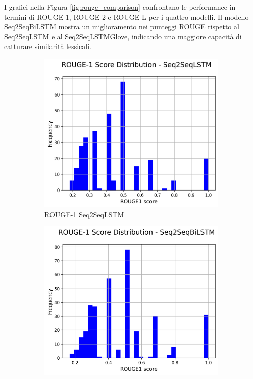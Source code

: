 I grafici nella Figura \ref{fig:rouge_comparison} confrontano le performance in termini di ROUGE-1, ROUGE-2 e ROUGE-L per i quattro modelli. Il modello Seq2SeqBiLSTM mostra un miglioramento nei punteggi ROUGE rispetto al Seq2SeqLSTM e al Seq2SeqLSTMGlove, indicando una maggiore capacit\`a di catturare similarit\`a lessicali.
\begin{figure}[H]
    \centering
    \begin{subfigure}{0.24\textwidth}
        \centering
        \includegraphics[width=\textwidth]{media/Seq2SeqLSTM_rouge1_scores.png}
        \caption{ROUGE-1 Seq2SeqLSTM}
    \end{subfigure}
    \hfill
    \begin{subfigure}{0.24\textwidth}
        \centering
        \includegraphics[width=\textwidth]{media/Seq2SeqBiLSTM_rouge1_scores.png}

\end{subfigure}
\end{figure}
